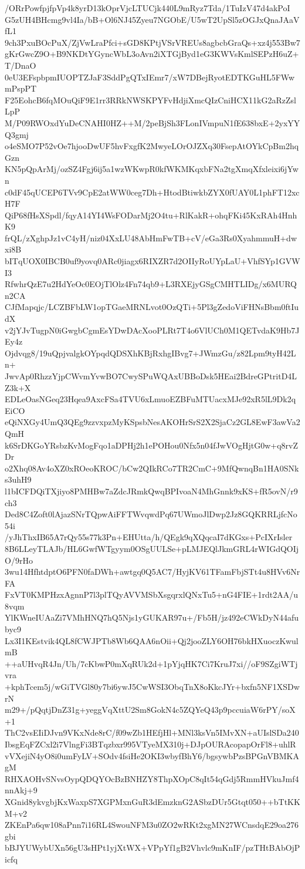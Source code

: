 /ORrPowfpjfpVp4k8yrD13kOprVjcLTUCjk440L9mRyz7Tda/1TuIzV47d4akPoI
G5zUH4BHcmg9vl4Ia/bB+Ol6NJ45Zyeu7NGObE/U5wT2UpSl5zOGJxQnaJAaVfL1
9ch3PxuBOcPuX/ZjVwLraPfci+sGD8KPtjVSrVREUs8agbcbGraQs+xz4j553Bw7
gKrGwcZ9O+B9NKDtYGyncWbL3oAvn2iXTGjByd1eG3KWVsKmlSEPzH6uZ+T/DnaO
0eU3EFspbpmIUOPTZJaF3SddPgQTxIEmr7/xW7DBejRyotEDTKGuHL5FWwmPspPT
F25EohcB6fqMOuQiF9E1rr3RRkNWSKPYFvHdjiXmcQIzCniHCX11kG2aRzZslLpP
M/P09RWOxdYuDeCNAHI0HZ++M/2peBjSh3FLonIVmpuN1fE638bxE+2yxYYQ3gmj
o4eSMO7P52vOe7hjooDwUF5hvFxgfK2MwyeLOrOJZXq30FsepAtOYkCpBm2hqGzn
KN5pQpArMj/ozSZ4Fgj6ij5a1wzWKwpR0kfWKMKqxbFNa2tgXmqXfxleixi6jYwn
c0dF45qUCEP6TVv9CpE2atWW0ceg7Dh+HtodBtiwkbZYX0fUAY0L1phFT12xcH7F
QiP68fHsXSpdl/fqyA14YI4WsFODarMj2O4tu+RlKakR+ohqFKi45KxRAh4HnhK9
frQL/zXghpJz1vC4yH/niz04XxLU48AbHmFwTB+cV/eGa3Rs0XyahmmuH+dwxi8B
bITqUOX0IBCB0uf9yovq0ARc0jiagx6RIXZR7d2OIIyRoUYpLaU+VhfSYp1GVWI3
RfwhrQzE7u2HdYeOc0EOjTlOlz4Fn74qb9+L3RXEjyGSgCMHTLIDg/x6MURQn2CA
CJfMapqjc/LCZBFbLW1opTGaeMRNLvot0OzQTi+5Pl3gZedoViFHNsBbm0ftIudX
v2jYJvTugpN0iGwgbCgmEsYDwDAcXooPLRt7T4o6VlUCh0M1QETvdaK9Hb7JEy4z
Ojdvqg8/19uQpjvalgkOYpqdQDSXhKBjRxhgIBvg7+JWmzGu/z82Lpm9tyH42Ln+
JwvAp0RhzzYjpCWvmYvwBO7CwySPuWQAxUBBoDsk5HEai2BdreGPtritD4LZ3k+X
EDLeOasNGeq23Hqea9AxcFSa4TVU6xLmuoEZBFuMTUacxMJe92xR5lL9Dk2qEiCO
eQiNXGy4UmQ3QEg9zzvxpzMyKSpsbNesAKOHrSrS2X2SjaCz2GL8EwF3awVa2QmH
k6SrDKGoYRsbzKvMogFqo1aDPHj2h1ePOHou0Nfx5n04fJwVOgHjtG0w+q8rvZDr
o2Xhq08Av4oXZ0xROeoKROC/bCw2QIkRCo7TR2CmC+9MfQwnqBn1HA0SNks3uhH9
l1bICFDQiTXjiyo8PMHBw7aZdcJRmkQwqBPIvoaN4MhGnnk9xKS+fR5ovN/r9ch3
Ded8C4Zoft0lAjazSNrTQpwAiFFTWvqwdPq67UWmoJlDwp2Jz8GQKRRLjfcNo54i
/yJhThxIB65A7rQy55s77k3Pn+EHUtta/h/QEgk9qXQqcaI7dKGxs+PcIXrIsler
8B6LLeyTLAJb/HL6GwfWTgyym0OSgUULSe+pLMJEQlJkmGRL4rWIGdQOIjO/9rHo
3wu14HfhtdptO6PFN0faDWh+awtgq0Q5AC7/HyjKV61TFamFbjSTt4u8HVv6NrFA
FxVT0KMPHzxAgnnP7l3plTQyAVVMSbXsgqrxlQNxTu5+nG4FIE+1rdt2AA/u8vqm
YlKWneIUAaZi7VMhHNQ7hQ5Njs1yGUKAR97u+/Fb5H/jz492eCWkDyN44afubyc9
Lx3I1KEstvik4QL8fCWJPTb8Wb6QAA6nOii+Qj2jooZLY6OH76bkHXuoczKwulmB
++aUHvqR4Jn/Uh/7cKbwP0mXqRUk2d+1pYjqHK7Ci7KruJ7xi//oF9SZgiWTjvra
+kphTcem5j/wGiTVGl80y7bi6ywJ5CwWSI3ObqTnX8oKkcJYr+bxfn5NF1XSDwrN
m29+/pQqtjDnZ31g+yeggVqXttU2Sm8GokN4c5ZQYeQ43p9pccuiaW6rPY/soX+1
ThC2vsEIiDJvn9VKxNde8rC/f09wZb1HEfjHl+MNl3ksVn5IMvXN+aUIslSDa240
IbsgEqFZCxl2i7VlngFi3BTqzbxr995VTyeMX310j+DJpOURAcopapOrFl8+uhlR
vVXejiN4yO8i0umFyLV+SOdv4fsiHe2OKI3wbyfBhY6/bgsywbPzsBPGnVBMKAgM
RHXAOHvSNvsOypQDQYOcBzBNHZY8ThpXOpC8qIt54qGdj5RmmHVkuJmf4nnAkj+9
XGnid8ykvgbjKxWaxpS7XGPMxnGuR3dEmzknG2ASbzDUr5Gtqt050++bTtKKM+v2
ZKEnPa6qw108aPnn7i16RL4SwouNFM3u0ZO2wRKt2xgMN27WCnsdqE29oa276gbi
bBJYUWybUXn56gU3sHPt1yjXtWX+VPpYf1gB2Vhvlc9mKnIF/pzTHtBAbOjPicfq
